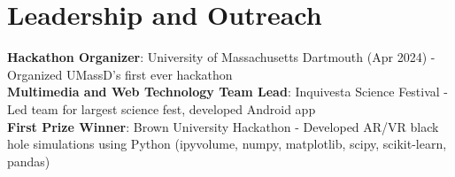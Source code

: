\documentclass[letterpaper,11pt]{article}
\newcommand{\customvspace}{\vspace{-2pt}}
\begin{document}
\section{Leadership and Outreach}
\customvspace
  \begin{itemize}[leftmargin=0.15in, label={}]
    \small{\item{
      \textbf{Hackathon Organizer}{: University of Massachusetts Dartmouth (Apr 2024) - Organized UMassD's first ever hackathon} \\
      \textbf{Multimedia and Web Technology Team Lead}{: Inquivesta Science Festival - Led team for largest science fest, developed Android app} \\
      \textbf{First Prize Winner}{: Brown University Hackathon - Developed AR/VR black hole simulations using Python (ipyvolume, numpy, matplotlib, scipy, scikit-learn, pandas)} \\
    }}
  \end{itemize}
  \vspace{-16pt}
\end{document}
